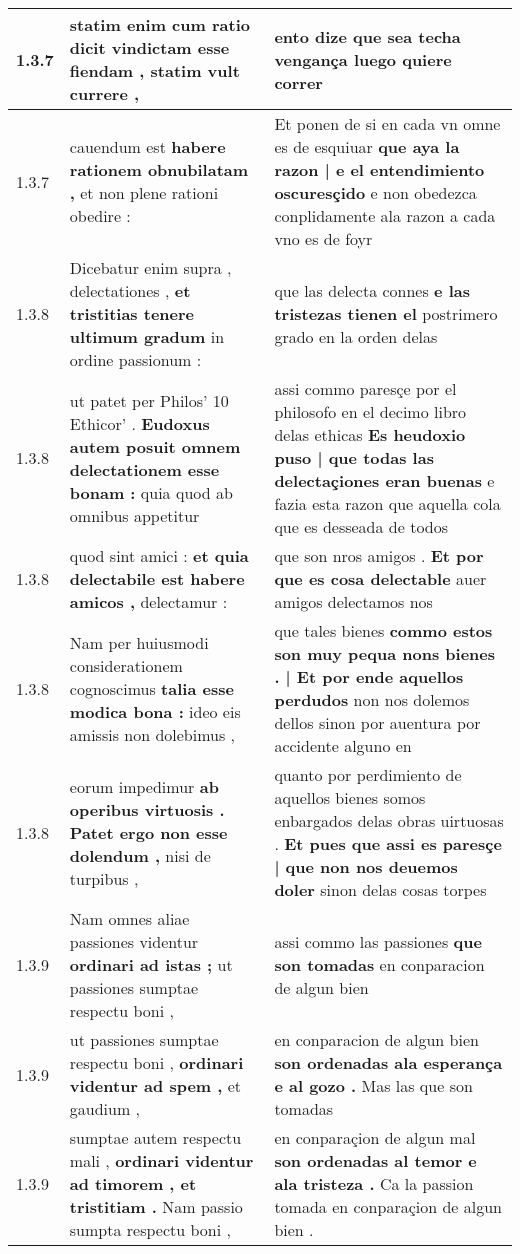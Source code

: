 \begin{tabular}{|p{1cm}|p{6.5cm}|p{6.5cm}|}
1.3.7 & statim enim cum ratio dicit \textbf{ vindictam esse fiendam , } statim vult currere , & ento dize \textbf{ que sea techa vengança } luego quiere correr \\\hline
1.3.7 & cauendum est \textbf{ habere rationem obnubilatam , } et non plene rationi obedire : & Et ponen de si en cada vn omne es de esquiuar \textbf{ que aya la razon | e el entendimiento oscuresçido } e non obedezca conplidamente ala razon a cada vno es de foyr \\\hline
1.3.8 & Dicebatur enim supra , delectationes , \textbf{ et tristitias tenere ultimum gradum } in ordine passionum : & que las delecta connes \textbf{ e las tristezas tienen el } postrimero grado en la orden delas \\\hline
1.3.8 & ut patet per Philos’ 10 Ethicor’ . \textbf{ Eudoxus autem posuit omnem delectationem esse bonam : } quia quod ab omnibus appetitur & assi commo paresçe por el philosofo en el decimo libro delas ethicas \textbf{ Es heudoxio puso | que todas las delectaçiones eran buenas } e fazia esta razon que aquella cola que es desseada de todos \\\hline
1.3.8 & quod sint amici : \textbf{ et quia delectabile est habere amicos , } delectamur : & que son nros amigos . \textbf{ Et por que es cosa delectable } auer amigos delectamos nos \\\hline
1.3.8 & Nam per huiusmodi considerationem cognoscimus \textbf{ talia esse modica bona : } ideo eis amissis non dolebimus , & que tales bienes \textbf{ commo estos son muy pequa nons bienes . | Et por ende aquellos perdudos } non nos dolemos dellos sinon por auentura por accidente alguno en \\\hline
1.3.8 & eorum impedimur \textbf{ ab operibus virtuosis . Patet ergo non esse dolendum , } nisi de turpibus , & quanto por perdimiento de aquellos bienes somos enbargados delas obras uirtuosas . \textbf{ Et pues que assi es paresçe | que non nos deuemos doler } sinon delas cosas torpes \\\hline
1.3.9 & Nam omnes aliae passiones videntur \textbf{ ordinari ad istas ; } ut passiones sumptae respectu boni , & assi commo las passiones \textbf{ que son tomadas } en conparacion de algun bien \\\hline
1.3.9 & ut passiones sumptae respectu boni , \textbf{ ordinari videntur ad spem , } et gaudium , & en conparacion de algun bien \textbf{ son ordenadas ala esperança e al gozo . } Mas las que son tomadas \\\hline
1.3.9 & sumptae autem respectu mali , \textbf{ ordinari videntur ad timorem , et tristitiam . } Nam passio sumpta respectu boni , & en conparaçion de algun mal \textbf{ son ordenadas al temor e ala tristeza . } Ca la passion tomada en conparaçion de algun bien . \\\hline

\end{tabular}
